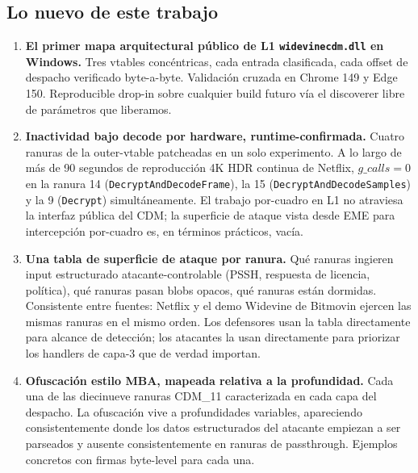 \documentclass[11pt,letterpaper]{article}
\begin{document}
\subsection*{Lo nuevo de este trabajo}

\begin{enumerate}[itemsep=4pt,topsep=2pt]
  \item \textbf{El primer mapa arquitectural público de L1
        \texttt{widevinecdm.dll} en Windows.} Tres vtables
        concéntricas, cada entrada clasificada, cada offset de
        despacho verificado byte-a-byte. Validación cruzada en
        Chrome 149 y Edge 150. Reproducible drop-in sobre cualquier
        build futuro vía el discoverer libre de parámetros que
        liberamos.

  \item \textbf{Inactividad bajo decode por hardware,
        runtime-confirmada.} Cuatro ranuras de la outer-vtable
        patcheadas en un solo experimento. A lo largo de más de 90
        segundos de reproducción 4K HDR continua de Netflix,
        \(g\_calls = 0\) en la ranura 14
        (\texttt{DecryptAndDecodeFrame}), la 15
        (\texttt{DecryptAndDecodeSamples}) y la 9
        (\texttt{Decrypt}) simultáneamente. El trabajo por-cuadro
        en L1 no atraviesa la interfaz pública del CDM; la
        superficie de ataque vista desde EME para intercepción
        por-cuadro es, en términos prácticos, vacía.

  \item \textbf{Una tabla de superficie de ataque por ranura.}
        Qué ranuras ingieren input estructurado
        atacante-controlable (PSSH, respuesta de licencia,
        política), qué ranuras pasan blobs opacos, qué ranuras
        están dormidas. Consistente entre fuentes: Netflix y el
        demo Widevine de Bitmovin ejercen las mismas ranuras en el
        mismo orden. Los defensores usan la tabla directamente
        para alcance de detección; los atacantes la usan
        directamente para priorizar los handlers de capa-3 que de
        verdad importan.

  \item \textbf{Ofuscación estilo MBA, mapeada relativa a la
        profundidad.} Cada una de las diecinueve ranuras CDM\_11
        caracterizada en cada capa del despacho. La ofuscación
        vive a profundidades variables, apareciendo consistentemente
        donde los datos estructurados del atacante empiezan a ser
        parseados y ausente consistentemente en ranuras de
        passthrough. Ejemplos concretos con firmas byte-level para
        cada una.


\end{enumerate}
\end{document}
